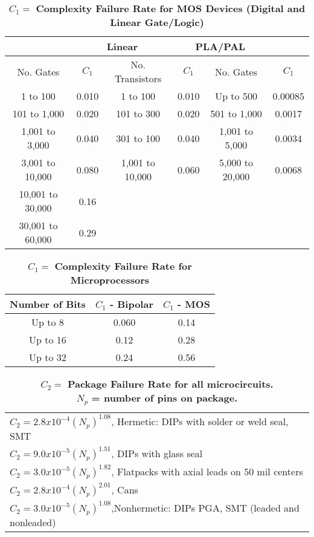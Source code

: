 \begin{table}[h]
\caption{ $C_{1} = $  \textbf{Complexity Failure Rate for MOS Devices (Digital and Linear Gate/Logic)}}
\label{table:complexFailureRateIc}
\begin{tabular}{|c|c|c|c|c|c|} \hline
\rowcolor{Gray}
\multicolumn{2}{|c|}{\textbf{Digital}} & \multicolumn{2}{c|}{\textbf{Linear}} & \multicolumn{2}{c|}{\textbf{PLA/PAL}} \\ \hline
\rowcolor{Gray}
No. Gates & $C_{1}$ & No. Transistors &$C_{1}$ & No. Gates & $C_{1}$ \\ \hline
1 to 100 			& 0.010 			& 1 to 100 			& 0.010 		& Up to 500 			& 0.00085 	\\ \hline
101 to 1,000		& 0.020 			& 101 to 300 		& 0.020 		& 501 to 1,000 			& 0.0017 	\\ \hline
1,001 to 3,000		& 0.040			& 301 to 100 		& 0.040 		& 1,001 to 5,000 		& 0.0034 	\\ \hline
3,001 to 10,000 	& 0.080 			& 1,001 to 10,000 	& 0.060 		& 5,000 to 20,000		& 0.0068		\\ \hline
10,001 to 30,000	& 0.16 				& 					&				&			 			&				\\ \hline
30,001 to 60,000	& 0.29 				& 					& 				&						&			\\ \hline
\end{tabular}
\end{table}

\begin{table}[h]
\caption{ $C_{1} = $  \textbf{Complexity Failure Rate for Microprocessors}}
\label{table:complexFailureRateMicro}
\begin{tabular}{|c|c|c|} \hline
\rowcolor{Gray}
\textbf{Number of Bits} & $C_{1}$ \textbf{- Bipolar} & $C_{1}$  \textbf{- MOS} \\ \hline
Up to 8 		& 0.060		&	0.14 		\\ \hline
Up to 16		& 0.12		& 	0.28		\\	\hline
Up to 32 		& 0.24		&	0.56		\\ \hline
\end{tabular}
\end{table}

\begin{table}[h]
\caption{ $C_{2} =$ \textbf{Package Failure Rate for all microcircuits.} \\ $N_{p}$ \textbf{= number of pins on package.}}
\label{table:packageFailRateIc}
\begin{tabular}{|l|} \hline
\T$C_{2} = 2.8 x 10^{-4} (N_{p})^{1.08}$, Hermetic: DIPs with solder or weld seal, SMT 			\\
\T$C_{2} = 9.0 x 10^{-5} (N_{p})^{1.51}$, DIPs with glass seal		\\
\T$C_{2} = 3.0 x 10^{-5} (N_{p})^{1.82}$, Flatpacks with axial leads on 50 mil centers		\\
\T$C_{2} = 2.8 x 10^{-4} (N_{p})^{2.01}$, Cans			\\
\T$C_{2} = 3.0 x 10^{-5} (N_{p})^{1.08}$,Nonhermetic: DIPs PGA, SMT (leaded and nonleaded)			\\ \hline
\end{tabular}
\end{table}

